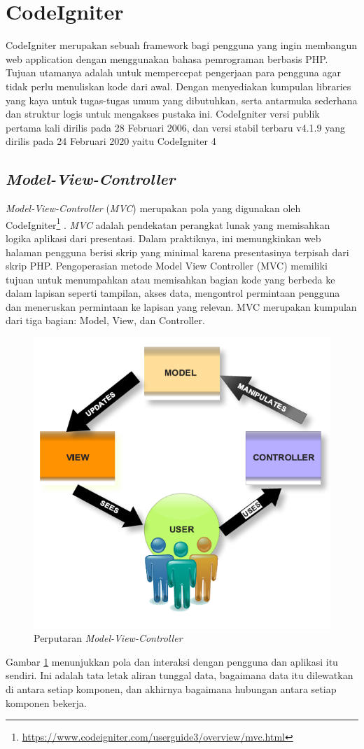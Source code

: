 \section{CodeIgniter}
\label{sec:CodeIgniter} 
 
CodeIgniter merupakan sebuah framework bagi pengguna yang ingin membangun web application dengan menggunakan bahasa pemrograman berbasis PHP\cite{codeigniter}. Tujuan utamanya adalah untuk mempercepat pengerjaan para pengguna agar tidak perlu menuliskan kode dari awal. Dengan menyediakan kumpulan libraries yang kaya untuk tugas-tugas umum yang dibutuhkan, serta antarmuka sederhana dan struktur logis untuk mengakses pustaka ini. CodeIgniter versi publik pertama kali dirilis pada 28 Februari 2006, dan versi stabil terbaru v4.1.9 yang dirilis pada 24 Februari 2020 yaitu CodeIgniter 4

\subsection{\textit{Model-View-Controller}}
\label{sec:Model-View-Controller}
\textit{Model-View-Controller} (\textit{MVC}) merupakan pola yang digunakan oleh CodeIgniter\footnote{\url{https://www.codeigniter.com/userguide3/overview/mvc.html}} . \textit{MVC} adalah pendekatan perangkat lunak yang memisahkan logika aplikasi dari presentasi. Dalam praktiknya, ini memungkinkan web halaman pengguna berisi skrip yang minimal karena presentasinya terpisah dari skrip PHP. Pengoperasian metode Model View Controller (MVC) memiliki tujuan untuk menumpahkan atau memisahkan bagian kode yang berbeda ke dalam lapisan seperti tampilan, akses data, mengontrol permintaan pengguna dan meneruskan permintaan ke lapisan yang relevan\cite{codeigniter}.  MVC merupakan kumpulan dari tiga bagian: Model, View, dan Controller. 

 \begin{figure}[h!]
     \centering
     \includegraphics[width=0.5\linewidth]{Gambar/MVC.PNG}
     \caption{Perputaran \textit{Model-View-Controller}}
     \label{fig:label}
 \end{figure}
Gambar \ref{fig:label} menunjukkan pola dan interaksi dengan pengguna dan aplikasi itu sendiri. Ini adalah tata letak aliran tunggal data, bagaimana data itu dilewatkan di antara setiap komponen, dan akhirnya bagaimana hubungan antara setiap komponen bekerja. 


